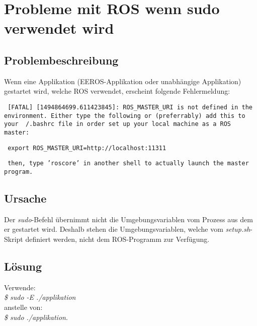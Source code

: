 \section{Probleme mit ROS wenn sudo verwendet wird}
\subsection{Problembeschreibung}
Wenn eine Applikation (EEROS-Applikation oder unabhängige Applikation) gestartet wird, welche ROS verwendet, erscheint folgende Fehlermeldung:


\texttt{
[FATAL] [1494864699.611423845]: ROS\_MASTER\_URI is not defined in the environment. Either type the following or (preferrably) add this to your ~/.bashrc file in order set up your local machine as a ROS master:
}

\texttt{
export ROS\_MASTER\_URI=http://localhost:11311
}

\texttt{
then, type 'roscore' in another shell to actually launch the master program.
}

\subsection{Ursache}
Der \textit{sudo}-Befehl übernimmt nicht die Umgebungsvariablen vom Prozess aus dem er gestartet wird.
Deshalb stehen die Umgebungsvariablen, welche vom \textit{setup.sh}-Skript definiert werden, nicht dem ROS-Programm zur Verfügung.

\subsection{Lösung}
Verwende: \\
\textit{\$ sudo -E ./applikation} \\
anstelle von: \\
\textit{\$ sudo ./applikation}.

